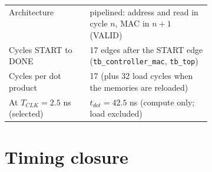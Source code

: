 \documentclass[10pt,letterpaper]{article}
\newcommand{\secbreak}{\Needspace{0.36\textheight}}
\newcommand{\code}[1]{\texttt{#1}}
\begin{document}
\begin{center}\small\begin{tabularx}{\linewidth}{@{}P{0.40\linewidth}L@{}}\toprule
Architecture & pipelined: address and read in cycle $n$, MAC in $n{+}1$ (VALID)\\\addlinespace
Cycles START to DONE & 17 edges after the START edge (\code{tb\_controller\_mac}, \code{tb\_top})\\\addlinespace
Cycles per dot product & 17 (plus 32 load cycles when the memories are reloaded)\\\addlinespace
At $T_{CLK}=2.5$ ns (selected) & $t_{dot}=42.5$ ns (compute only; load excluded)\\\bottomrule
\end{tabularx}\end{center}

\secbreak
\section{Timing closure}\label{sec:timing}
\end{document}
